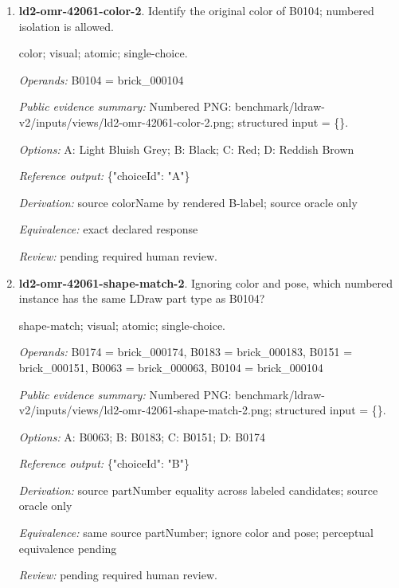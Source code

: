 \begin{enumerate}
\par{\small distance; source-data; atomic; single-choice.\par\textit{Operands:} B0088 = brick\_000088, B0203 = brick\_000203, B0194 = brick\_000194, B0021 = brick\_000021\par\textit{Public evidence summary:} \{"coordinateFrame": "Viewer world, millimeters, Euclidean distance", "centers": \{"B0088": [8, 92, 25.6], "B0021": [-8, 24.8, 76], "B0194": [8, 100, 129.6], "B0203": [39.9992, 48.8016, 56]\}\}\par\textit{Options:} A: B0021; B: B0194; C: B0203\par\textit{Reference output:} \{"choiceId": "C"\}\par\textit{Derivation:} Euclidean norm from public rounded centers\par\textit{Equivalence:} exact declared response\par\textit{Review:} machine checks passed; no human certification.}
\item \textbf{ld2-omr-42061-color-2}. Identify the original color of B0104; numbered isolation is allowed.
\par{\small color; visual; atomic; single-choice.\par\textit{Operands:} B0104 = brick\_000104\par\textit{Public evidence summary:} Numbered PNG: benchmark/ldraw-v2/inputs/views/ld2-omr-42061-color-2.png; structured input = \{\}.\par\textit{Options:} A: Light Bluish Grey; B: Black; C: Red; D: Reddish Brown\par\textit{Reference output:} \{"choiceId": "A"\}\par\textit{Derivation:} source colorName by rendered B-label; source oracle only\par\textit{Equivalence:} exact declared response\par\textit{Review:} pending required human review.}
\item \textbf{ld2-omr-42061-shape-match-2}. Ignoring color and pose, which numbered instance has the same LDraw part type as B0104?
\par{\small shape-match; visual; atomic; single-choice.\par\textit{Operands:} B0174 = brick\_000174, B0183 = brick\_000183, B0151 = brick\_000151, B0063 = brick\_000063, B0104 = brick\_000104\par\textit{Public evidence summary:} Numbered PNG: benchmark/ldraw-v2/inputs/views/ld2-omr-42061-shape-match-2.png; structured input = \{\}.\par\textit{Options:} A: B0063; B: B0183; C: B0151; D: B0174\par\textit{Reference output:} \{"choiceId": "B"\}\par\textit{Derivation:} source partNumber equality across labeled candidates; source oracle only\par\textit{Equivalence:} same source partNumber; ignore color and pose; perceptual equivalence pending\par\textit{Review:} pending required human review.}

\end{enumerate}

